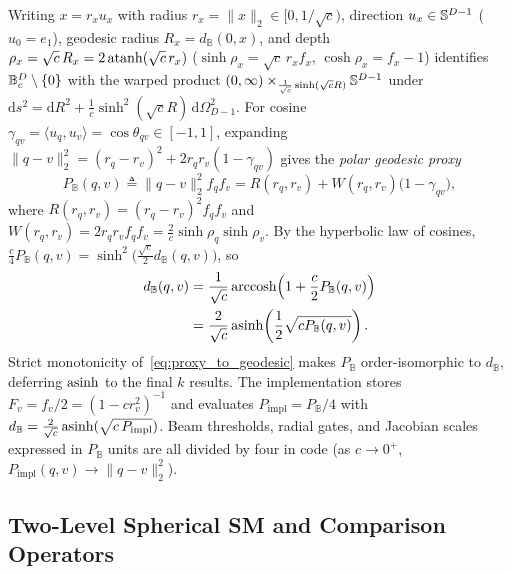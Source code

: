 Writing $x = r_x u_x$ with radius $r_x = \|x\|_2 \in [0, 1/\sqrt{c})$, direction $u_x \in \mathbb{S}^{D-1}$ ($u_0 = e_1$), geodesic radius $R_x = d_{\mathbb{B}}(0, x)$, and depth $\rho_x = \sqrt{c}\,R_x = 2\operatorname{atanh}(\sqrt{c}\,r_x)$ ($\sinh\rho_x = \sqrt{c}\,r_x f_x$, $\cosh\rho_x = f_x - 1$) identifies $\mathbb{B}_c^D \setminus \{0\}$ with the warped product $(0, \infty) \times_{\frac{1}{\sqrt{c}}\sinh(\sqrt{c}R)} \mathbb{S}^{D-1}$ under $\mathrm{d}s^2 = \mathrm{d}R^2 + \frac{1}{c}\sinh^2(\sqrt{c}R)\,\mathrm{d}\Omega_{D-1}^2$.
For cosine $\gamma_{qv} = \langle u_q, u_v\rangle = \cos\theta_{qv} \in [-1, 1]$, expanding $\|q - v\|_2^2 = (r_q - r_v)^2 + 2 r_q r_v(1 - \gamma_{qv})$ gives the \emph{polar geodesic proxy}
\begin{equation}
  P_{\mathbb{B}}(q, v) \triangleq \|q - v\|_2^2 f_q f_v = R(r_q, r_v) + W(r_q, r_v)\bigl(1 - \gamma_{qv}\bigr),
  \label{eq:polar_proxy}
\end{equation}
where $R(r_q, r_v) = (r_q - r_v)^2 f_q f_v$ and $W(r_q, r_v) = 2 r_q r_v f_q f_v = \frac{2}{c}\sinh\rho_q\sinh\rho_v$.
By the hyperbolic law of cosines, $\frac{c}{4}P_{\mathbb{B}}(q, v) = \sinh^2\bigl(\frac{\sqrt{c}}{2}d_{\mathbb{B}}(q, v)\bigr)$, so
\begin{equation}
  \begin{aligned}
    d_{\mathbb{B}}(q,v)
    &=\frac{1}{\sqrt c}\operatorname{arccosh}\!\left(1+\frac c2 P_{\mathbb B}(q,v)\right)\\
    &=\frac{2}{\sqrt c}\operatorname{asinh}\!\left(\frac12\sqrt{cP_{\mathbb B}(q,v)}\right).
  \end{aligned}
  \label{eq:proxy_to_geodesic}
\end{equation}
Strict monotonicity of~\eqref{eq:proxy_to_geodesic} makes $P_{\mathbb{B}}$ order-isomorphic to $d_{\mathbb{B}}$, deferring $\operatorname{asinh}$ to the final $k$ results.
The implementation stores $F_v = f_v/2 = (1 - c r_v^2)^{-1}$ and evaluates $P_{\mathrm{impl}} = P_{\mathbb{B}}/4$ with $d_{\mathbb{B}} = \frac{2}{\sqrt{c}}\operatorname{asinh}(\sqrt{c\,P_{\mathrm{impl}}})$. Beam thresholds, radial gates, and Jacobian scales expressed in $P_{\mathbb B}$ units are all divided by four in code (as $c \to 0^+$, $P_{\mathrm{impl}}(q, v) \to \|q - v\|_2^2$).

\subsection{Two-Level Spherical SM and Comparison Operators}
\label{subsec:sm_decisions}


